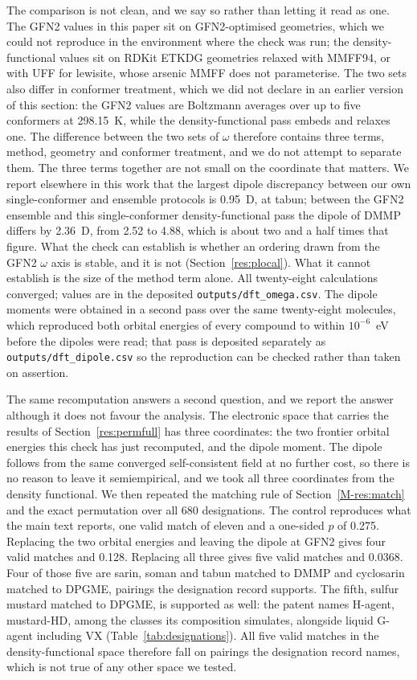 \documentclass[11pt,a4paper]{article}
\begin{document}
The comparison is not clean, and we say so rather than letting it read as one.
The GFN2 values in this paper sit on GFN2-optimised geometries, which we could
not reproduce in the environment where the check was run; the density-functional
values sit on RDKit ETKDG geometries relaxed with MMFF94, or with UFF for
lewisite, whose arsenic MMFF does not parameterise. The two sets also differ in conformer treatment, which we did not
declare in an earlier version of this section: the GFN2 values are Boltzmann
averages over up to five conformers at 298.15~K, while the density-functional
pass embeds and relaxes one. The difference between the two sets of $\omega$
therefore contains three terms, method, geometry and conformer treatment, and
we do not attempt to separate them. The three terms together are not small on the
coordinate that matters. We report elsewhere in this work that the largest dipole
discrepancy between our own single-conformer and ensemble protocols is 0.95~D,
at tabun; between the GFN2 ensemble and this single-conformer
density-functional pass the dipole of DMMP differs by 2.36~D, from 2.52 to
4.88, which is about two and a half times that figure. What the check can establish is
whether an ordering drawn from the GFN2 $\omega$ axis is stable, and it is not
(Section~\ref{res:plocal}). What it cannot establish is the size of the method
term alone. All twenty-eight calculations converged; values are in the deposited
\texttt{outputs/dft\_omega.csv}. The dipole moments were obtained in a second
pass over the same twenty-eight molecules, which reproduced both orbital
energies of every compound to within $10^{-6}$~eV before the dipoles were read;
that pass is deposited separately as \texttt{outputs/dft\_dipole.csv} so the
reproduction can be checked rather than taken on assertion.

The same recomputation answers a second question, and we report the answer
although it does not favour the analysis. The electronic space that carries the
results of Section~\ref{res:permfull} has three coordinates: the two frontier
orbital energies this check has just recomputed, and the dipole moment. The
dipole follows from the same converged self-consistent field at no further cost,
so there is no reason to leave it semiempirical, and we took all three
coordinates from the density functional. We then repeated the matching rule of
Section~\ref{M-res:match} and the exact permutation over all 680 designations.
The control reproduces what the main text reports, one valid match of eleven and
a one-sided $p$ of 0.275. Replacing the two orbital energies and leaving the
dipole at GFN2 gives four valid matches and 0.128. Replacing all three gives
five valid matches and 0.0368. Four of those five are sarin, soman and tabun
matched to DMMP and cyclosarin matched to DPGME, pairings the designation record
supports. The fifth, sulfur mustard matched to DPGME, is supported as well: the
patent names H-agent, mustard-HD, among the classes its composition simulates,
alongside liquid G-agent including VX (Table~\ref{tab:designations}). All five valid
matches in the density-functional space therefore fall on pairings the
designation record names, which is not true of any other space we tested.
\end{document}

